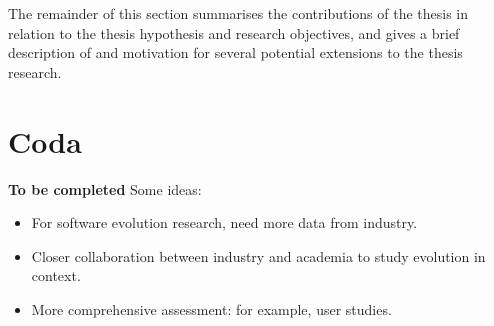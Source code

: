 The remainder of this section summarises the contributions of the thesis in relation to the thesis hypothesis and research objectives, and gives a brief description of and motivation for several potential extensions to the thesis research.






\section{Coda}
\textbf{To be completed} Some ideas:
\begin{itemize}
	\item For software evolution research, need more data from industry.
	\item Closer collaboration between industry and academia to study evolution in context.
	\item More comprehensive assessment: for example, user studies.	
\end{itemize}

